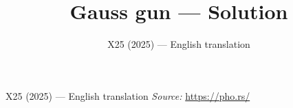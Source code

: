 \documentclass[11pt,a4paper]{article}
\title{\textbf{Gauss gun --- Solution}}
\author{\normalsize X25 (2025) — English translation}
\date{}
\begin{document}
\maketitle
X25 (2025) — English translation
\vspace{1em}
\noindent\textit{Source:} \url{https://pho.rs/}
\end{document}
